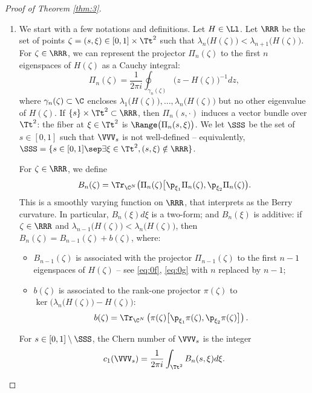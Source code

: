 \skpt
\begin{proof}[Proof of Theorem \ref{thm:3}]
\begin{enumerate}
\item
We start with a few notations and definitions. Let $H \in \Ll$. Let $\RRR$ be the set of points $\zeta = (s,\xi) \in [0,1] \times \Tt^2$ such that $\lambda_n\bigl( H(\zeta) \bigr) < \lambda_{n+1}\bigl(H(\zeta)\bigr)$. For $\zeta \in \RRR$, we can represent the projector $\Pi_n(\zeta)$ to the first $n$ eigenspaces of $H(\zeta)$ as a Cauchy integral:
\begin{equation}\label{eq:0f}
\Pi_n(\zeta) =
\dfrac{1}{2\pi i}\oint_{\gamma_n(\zeta)} \bigl( z - H(\zeta) \bigr)^{-1} dz,
\end{equation}
where $\gamma_n(\zeta) \subset \C$ encloses $\lambda_1\bigl( H(\zeta) \bigr), \dots, \lambda_n\bigl( H(\zeta) \bigr)$ but no other eigenvalue of $H(\zeta)$. If $\{s \} \times \Tt^2 \subset \RRR$, then $\Pi_n(s,\cdot)$ induces a vector bundle over $\Tt^2$: the fiber at $\xi \in \Tt^2$ is $\Range\bigl( \Pi_n(s,\xi)\bigr)$. We let $\SSS$ be the set of $s \in [0,1]$ such that $\VVV_s$ is not well-defined -- equivalently, $\SSS = \{s \in [0,1]\sep\exists \xi \in \Tt^2, (s,\xi) \notin \RRR\}$.

For $\zeta \in \RRR$, we define
\begin{equation}\label{eq:0g}
B_n(\zeta) = \Tr_{\C^N} \bigl( \Pi_n(\zeta) \bigl[ \p_{\xi_1} \Pi_n(\zeta), \p_{\xi_2} \Pi_n(\zeta) \bigr).
\end{equation}
This is a smoothly varying function on $\RRR$, that interprets as the Berry curvature. In particular, $B_n(\xi)d\xi$ is a two-form; and $B_n(\xi)$ is additive: if $\zeta \in \RRR$ and $\lambda_{n-1}\bigl( H(\zeta) \bigr) < \lambda_n\bigl(H(\zeta)\bigr)$, then $B_n(\zeta) = B_{n-1}(\zeta) + b(\zeta)$, where:
\begin{itemize}
\item $B_{n-1}(\zeta)$ is associated with the projector $\Pi_{n-1}(\zeta)$ to the first $n-1$ eigenspaces of $H(\zeta)$ -- see \eqref{eq:0f}, \eqref{eq:0g} with $n$ replaced by $n-1$;
\item $b(\zeta)$ is associated to the rank-one projector $\pi(\zeta)$ to $\ker\bigl( \lambda_n \bigl(H(\zeta)\bigr) - H(\zeta) \bigr)$:
\begin{equation}\label{eq:0y}
b(\zeta) = \Tr_{\C^N} \left( \pi(\zeta) \bigl[ \p_{\xi_1} \pi(\zeta), \p_{\xi_2} \pi(\zeta) \bigr]\right).
\end{equation}
\end{itemize}
For $s \in [0,1] \setminus \SSS$, the Chern number of $\VVV_s$ is the integer
\begin{equation*}
c_1(\VVV_s) = \dfrac{1}{2\pi i} \int_{\Tt^2} B_n(s,\xi) d\xi.
\end{equation*}


\end{enumerate}
\end{proof}
